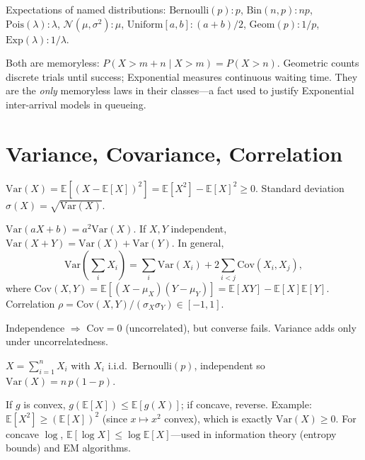 Expectations of named distributions: $\mathrm{Bernoulli}(p):p$, $\mathrm{Bin}(n,p):np$, $\mathrm{Pois}(\lambda):\lambda$, $\mathcal{N}(\mu,\sigma^2):\mu$, $\mathrm{Uniform}[a,b]:(a+b)/2$, $\mathrm{Geom}(p):1/p$, $\mathrm{Exp}(\lambda):1/\lambda$.

\begin{remark} Both are memoryless: $P(X>m+n\mid X>m)=P(X>n)$. Geometric counts discrete trials until success; Exponential measures continuous waiting time. They are the \emph{only} memoryless laws in their classes---a fact used to justify Exponential inter-arrival models in queueing.
\end{remark}

\section{Variance, Covariance, Correlation}
\label{sec:variance}

\begin{definition}[Variance] $\mathrm{Var}(X)=\mathbb{E}[(X-\mathbb{E}[X])^2]=\mathbb{E}[X^2]-\mathbb{E}[X]^2\ge0$. Standard deviation $\sigma(X)=\sqrt{\mathrm{Var}(X)}$.
\end{definition}

\begin{theorem}[Properties] $\mathrm{Var}(aX+b)=a^2\mathrm{Var}(X)$. If $X,Y$ independent, $\mathrm{Var}(X+Y)=\mathrm{Var}(X)+\mathrm{Var}(Y)$. In general,
\[
\mathrm{Var}\!\left(\sum_i X_i\right)=\sum_i\mathrm{Var}(X_i)+2\sum_{i<j}\mathrm{Cov}(X_i,X_j),
\]
where $\mathrm{Cov}(X,Y)=\mathbb{E}[(X-\mu_X)(Y-\mu_Y)]=\mathbb{E}[XY]-\mathbb{E}[X]\mathbb{E}[Y]$. Correlation $\rho=\mathrm{Cov}(X,Y)/(\sigma_X\sigma_Y)\in[-1,1]$.
\end{theorem}

Independence $\Rightarrow$ $\mathrm{Cov}=0$ (uncorrelated), but converse fails. Variance adds only under uncorrelatedness.

\begin{example} $X=\sum_{i=1}^n X_i$ with $X_i$ i.i.d.\ $\mathrm{Bernoulli}(p)$, independent so $\mathrm{Var}(X)=n\,p(1-p)$.
\end{example}

\begin{theorem} If $g$ is convex, $g(\mathbb{E}[X])\le\mathbb{E}[g(X)]$; if concave, reverse. Example: $\mathbb{E}[X^2]\ge(\mathbb{E}[X])^2$ (since $x\mapsto x^2$ convex), which is exactly $\mathrm{Var}(X)\ge0$. For concave $\log$, $\mathbb{E}[\log X]\le\log\mathbb{E}[X]$---used in information theory (entropy bounds) and EM algorithms.
\end{theorem}

